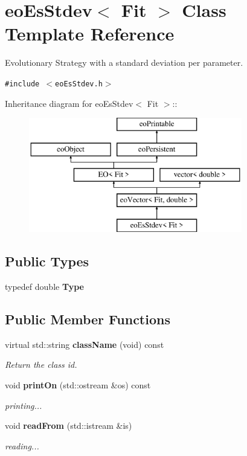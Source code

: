 \section{eo\-Es\-Stdev$<$ Fit $>$ Class Template Reference}
\label{classeo_es_stdev}
Evolutionary Strategy with a standard deviation per parameter.  


{\tt \#include $<$eo\-Es\-Stdev.h$>$}

Inheritance diagram for eo\-Es\-Stdev$<$ Fit $>$::\begin{figure}[H]
\begin{center}
\leavevmode
\includegraphics[height=5cm]{classeo_es_stdev}
\end{center}
\end{figure}
\subsection*{Public Types}
\begin{CompactItemize}
\item 
typedef double {\bf Type}\label{classeo_es_stdev_w0}

\end{CompactItemize}
\subsection*{Public Member Functions}
\begin{CompactItemize}
\item 
virtual std::string {\bf class\-Name} (void) const 
\begin{CompactList}\small\item\em Return the class id. \item\end{CompactList}\item 
void {\bf print\-On} (std::ostream \&os) const \label{classeo_es_stdev_a2}

\begin{CompactList}\small\item\em printing... \item\end{CompactList}\item 
void {\bf read\-From} (std::istream \&is)\label{classeo_es_stdev_a3}

\begin{CompactList}\small\item\em reading... \item\end{CompactList}\end{CompactItemize}
